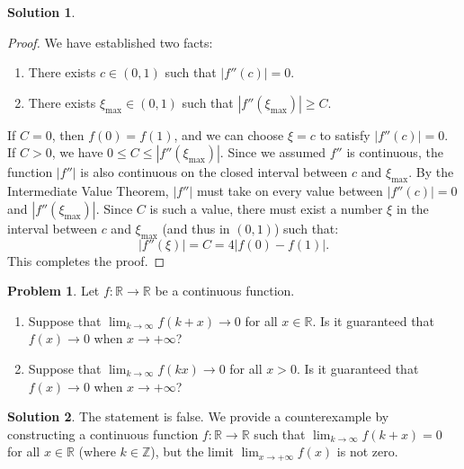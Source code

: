 \documentclass[12pt]{article}
\theoremstyle{definition}
\newtheorem*{solution}{\normalfont\textbf{Solution}}
\newtheorem*{Problem}{\noindent\textbf{Problem}}
\begin{document}
\begin{enumerate}[leftmargin=*]
\begin{solution}
\begin{proof}
            We have established two facts:
            \begin{enumerate}
                \item[1.] There exists \( c \in (0, 1) \) such that \( |f''(c)| = 0 \).
                \item[2.] There exists \( \xi_{\text{max}} \in (0, 1) \) such that \( |f''(\xi_{\text{max}})| \ge C \).
            \end{enumerate}
            If \( C=0 \), then \( f(0)=f(1) \), and we can choose \( \xi=c \) to satisfy \( |f''(c)| = 0 \).
            If \( C > 0 \), we have \( 0 \le C \le |f''(\xi_{\text{max}})| \). Since we assumed \( f'' \) is continuous, the function \( |f''| \) is also continuous on the closed interval between \( c \) and \( \xi_{\text{max}} \). By the Intermediate Value Theorem, \( |f''| \) must take on every value between \( |f''(c)|=0 \) and \( |f''(\xi_{\text{max}})| \). Since \( C \) is such a value, there must exist a number \( \xi \) in the interval between \( c \) and \( \xi_{\text{max}} \) (and thus in \( (0, 1) \)) such that:
            \[
            |f''(\xi)| = C = 4|f(0) - f(1)|.
            \]
            This completes the proof.
        \end{proof}
    \end{solution}
    
    \item \begin{Problem}
            Let \( f : \mathbb{R} \to \mathbb{R} \) be a continuous function.
            \begin{enumerate}
                \item[(a)] Suppose that \( \lim_{k \to \infty} f(k + x) \to 0 \) for all \( x \in \mathbb{R} \). Is it guaranteed that \( f(x) \to 0 \) when \( x \to +\infty \)?
                \item[(b)] Suppose that \( \lim_{k \to \infty} f(kx) \to 0 \) for all \( x > 0 \). Is it guaranteed that \( f(x) \to 0 \) when \( x \to +\infty \)?
            \end{enumerate}
        \end{Problem}
        \begin{solution}
        \item [(a)]
            The statement is false. We provide a counterexample by constructing a continuous function $f: \mathbb{R} \to \mathbb{R}$ such that $\lim_{k \to \infty} f(k + x) = 0$ for all $x \in \mathbb{R}$ (where $k \in \mathbb{Z}$), but the limit $\lim_{x \to +\infty} f(x)$ is not zero.


\end{solution}
\end{enumerate}
\end{document}
